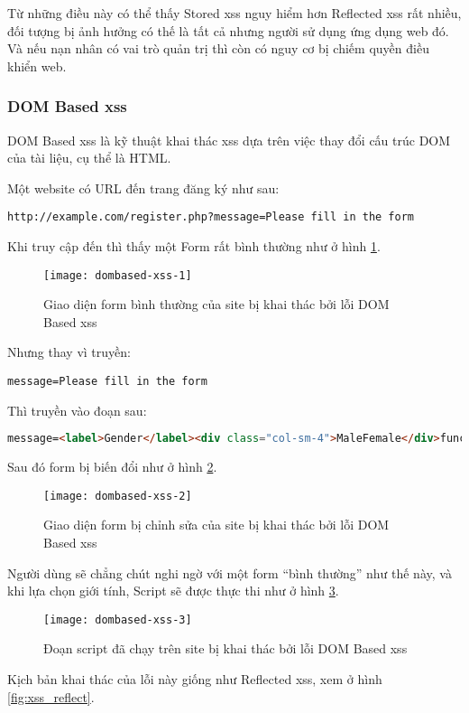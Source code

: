 \documentclass[../main-report.tex]{subfiles}
\begin{document}
Từ những điều này có thể thấy Stored \acrshort{xss} nguy hiểm hơn Reflected \acrshort{xss} rất nhiều, đối tượng bị ảnh hưởng có thế là tất cả nhưng người sử dụng ứng dụng web đó. Và nếu nạn nhân có vai trò quản trị thì còn có nguy cơ bị chiếm quyền điều khiển web.

\subsubsection*{DOM Based \acrshort{xss}}
DOM Based \acrshort{xss} là kỹ thuật khai thác \acrshort{xss} dựa trên việc thay đổi cấu trúc DOM của tài liệu, cụ thể là HTML. 

\begin{example}
Một website có URL đến trang đăng ký như sau:

\begin{lstlisting}
http://example.com/register.php?message=Please fill in the form
\end{lstlisting}
\end{example}

Khi truy cập đến thì thấy một Form rất bình thường như ở hình \ref{fig:xss_dombased_1}.

\begin{figure}[ht!]
\centering\texttt{[image: dombased-xss-1]}
\caption{Giao diện form bình thường của site bị khai thác bởi lỗi DOM Based \acrshort{xss}}
\label{fig:xss_dombased_1}
\end{figure}

Nhưng thay vì truyền:

\begin{lstlisting}
message=Please fill in the form
\end{lstlisting}

Thì truyền vào đoạn sau:

\begin{lstlisting}[language=HTML]
message=<label>Gender</label><div class="col-sm-4">MaleFemale</div>function show(){alert();}
\end{lstlisting}

Sau đó form bị biến đổi như ở hình \ref{fig:xss_dombased_2}.

\begin{figure}[ht!]
\centering\texttt{[image: dombased-xss-2]}
\caption{Giao diện form bị chỉnh sửa của site bị khai thác bởi lỗi DOM Based \acrshort{xss}}
\label{fig:xss_dombased_2}
\end{figure}

Người dùng sẽ chẳng chút nghi ngờ với một form ``bình thường'' như thế này, và khi lựa chọn giới tính, Script sẽ được thực thi như ở hình \ref{fig:xss_dombased_3}.

\begin{figure}[ht!]
\centering\texttt{[image: dombased-xss-3]}
\caption{Đoạn script đã chạy trên site bị khai thác bởi lỗi DOM Based \acrshort{xss}}
\label{fig:xss_dombased_3}
\end{figure}

Kịch bản khai thác của lỗi này giống như Reflected \acrshort{xss}, xem ở hình \ref{fig:xss_reflect}.
\end{document}
